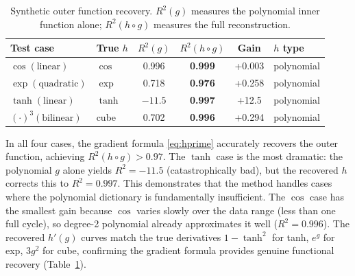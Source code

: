 \documentclass{article}
\begin{document}
\begin{table}[ht]
\centering
\begin{tabular}{@{}llcccl@{}}
\toprule
Test case & True $h$ & $R^2(g)$ & $R^2(h\!\circ\!g)$ & Gain & $h$ type \\
\midrule
$\cos(\text{linear})$ & $\cos$ & 0.996 & \textbf{0.999} & +0.003 & polynomial \\
$\exp(\text{quadratic})$ & $\exp$ & 0.718 & \textbf{0.976} & +0.258 & polynomial \\
$\tanh(\text{linear})$ & $\tanh$ & $-11.5$ & \textbf{0.997} & +12.5 & polynomial \\
$(\cdot)^3\!(\text{bilinear})$ & cube & 0.702 & \textbf{0.996} & +0.294 & polynomial \\
\bottomrule
\end{tabular}
\caption{Synthetic outer function recovery. $R^2(g)$ measures the polynomial inner function alone; $R^2(h \circ g)$ measures the full reconstruction.}
\label{tab:synthetic}
\end{table}

In all four cases, the gradient formula \eqref{eq:hprime} accurately recovers the outer function, achieving $R^2(h \circ g) > 0.97$. The $\tanh$ case is the most dramatic: the polynomial $g$ alone  yields $R^2 = -11.5$ (catastrophically bad), but the recovered $h$  corrects this to $R^2 = 0.997$. This demonstrates that the method handles cases where the polynomial dictionary is fundamentally insufficient. The $\cos$ case has the smallest gain because $\cos$ varies slowly over the data range (less than one full cycle), so  degree-2 polynomial already approximates it well ($R^2 = 0.996$).  The recovered $h'(g)$ curves match the true derivatives $1 - \tanh^2$ for tanh, $e^g$ for exp, $3g^2$ for cube, confirming the gradient formula provides genuine functional recovery (Table~\ref{tab:synthetic}).



% 
\end{document}
